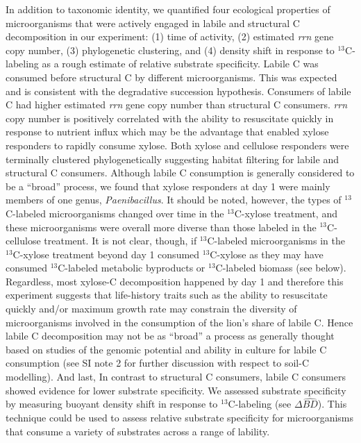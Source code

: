 In addition to taxonomic identity, we quantified four ecological properties of
microorganisms that were actively engaged in labile and structural C
decomposition in our experiment: (1) time of activity, (2) estimated
\textit{rrn} gene copy number, (3) phylogenetic clustering, and (4) density
shift in response to $^{13}$C-labeling as a rough estimate of relative
substrate specificity. Labile C was consumed before structural C by different
microorganisms. This was expected and is consistent with the degradative
succession hypothesis. Consumers of labile C had higher estimated \textit{rrn}
gene copy number than structural C consumers.  \textit{rrn} copy number is
positively correlated with the ability to resuscitate quickly in response to
nutrient influx \citep{Klappenbach_2000} which may be the advantage that
enabled xylose responders to rapidly consume xylose. Both xylose and cellulose
responders were terminally clustered phylogenetically suggesting habitat
filtering for labile and structural C consumers. Although labile C
consumption is generally considered to be a ``broad'' process, we found that
xylose responders at day 1 were mainly members of one genus,
\textit{Paenibacillus}.  It should be noted, however, the types of
$^{13}$C-labeled microorganisms changed over time in the $^{13}$C-xylose
treatment, and these microorganisms were overall more diverse than those
labeled in the $^{13}$C-cellulose treatment. It is not clear, though,  if
$^{13}$C-labeled microorganisms in the $^{13}$C-xylose treatment beyond day 1
consumed $^{13}$C-xylose as they may have consumed
$^{13}$C-labeled metabolic byproducts or $^{13}$C-labeled biomass (see below).
Regardless, most xylose-C decomposition happened by day 1 and therefore this
experiment suggests that life-history traits such as the ability to resuscitate
quickly and/or maximum growth rate may constrain the diversity of
microorganisms involved in the consumption of the lion's share of labile C.
Hence labile C decomposition may not be as ``broad'' a process as generally
thought based on studies of the genomic potential and ability in culture for
labile C consumption (see SI note 2 for further discussion with respect to
soil-C modelling). And last, In contrast to structural C consumers, labile C
consumers showed evidence for lower substrate specificity. We assessed
substrate specificity by measuring buoyant density shift in response to
$^{13}$C-labeling (see $\Delta\hat{BD}$). This technique could be used to
assess relative substrate specificity for microorganisms that consume a variety
of substrates across a range of lability.

